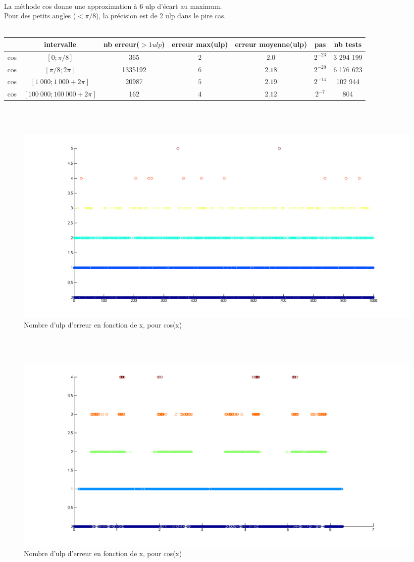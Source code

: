 \documentclass[a4,12pt]{article}
\begin{document}
\\
\newpage
La méthode cos donne une approximation à 6 ulp d'écart au maximum.\\
Pour des petits angles ($<\pi /8$), la précision est de 2 ulp dans le pire cas.\\
\\
\hspace{-4cm}\begin{tabular}{|c|c|c|c|c|c|c|}

\hline 
 & intervalle & nb erreur($>1 ulp$) & erreur max(ulp)& erreur moyenne(ulp) & pas & nb tests \\
\hline 
cos & $[0; \pi /8]$             & 365      & $2$ & 2.0        &$2^{-23}$ & 3 294 199\\
\hline 
cos & $[\pi /8; 2\pi]$          & 1335192 & $6$ &$2.18$ & $2^{-20}$ & 6 176 623\\
\hline 
cos & $[1\ 000; 1\ 000 + 2\pi]$     & 20987    & $5$ &$2.19$ & $2^{-14}$ & 102 944\\
\hline 
cos & $[100\ 000; 100\ 000 + 2\pi]$ & 162     & $4$ &$ 2.12$ & $2^{-7}$ & 804\\
\hline
\end{tabular}
\\
\\
\hspace{-6cm}\begin{figure}[h!]
    \centering
    \includegraphics[scale=0.5]{cos1000}
    \caption{Nombre d'ulp d'erreur en fonction de x, pour cos(x)}
    \label{fig:my_label}
\end{figure}

\\
\\
\hspace{-6cm}\begin{figure}[h!]
    \centering
    \includegraphics[scale=0.5]{cos2PI}
    \caption{Nombre d'ulp d'erreur en fonction de x, pour cos(x)}
    \label{fig:my_label}
\end{figure}
\end{document}
